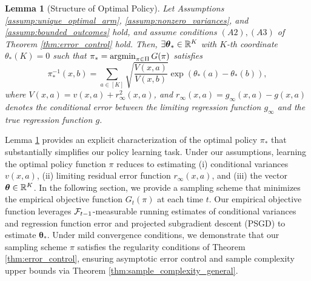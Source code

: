 \documentclass{article}
\newtheorem{lemma}{Lemma}
\begin{document}
\begin{lemma}[Structure of Optimal Policy]\label{lem:optimal_policy_structure}
    Let Assumptions \ref{assump:unique_optimal_arm}, \ref{assump:nonzero_variances}, and \ref{assump:bounded_outcomes} hold, and assume conditions $(A2), (A3)$ of Theorem \ref{thm:error_control} hold. Then, $\exists \boldsymbol{\theta}_* \in \mathbb{R}^K$ with $K$-th coordinate ${\theta_*}(K) = 0$ such that $\pi_* = \argmin_{\pi \in \Pi} G(\pi)$ satisfies 
    \begin{equation}
        \pi_*^{-1}(x,b) = \sum_{a \in [K]} \sqrt{\frac{{V(x,a)}}{{V(x,b)}}} \exp(\theta_*(a) - \theta_*(b)),  
    \end{equation}
    where $V(x,a)= v(x,a) + r_\infty^2(x,a)$, and $r_\infty(x,a)=g_\infty(x,a) - g(x,a)$ denotes the conditional error between the limiting regression function $g_\infty$ and the true regression function $g$. 
\end{lemma}

Lemma \ref{lem:optimal_policy_structure} provides an explicit characterization of the optimal policy $\pi_*$ that substantially simplifies our policy learning task. Under our assumptions, learning the optimal policy function $\pi$ reduces to estimating (i) conditional variances $v(x,a)$, (ii) limiting residual error function $r_\infty(x,a)$, and (iii) the vector $\boldsymbol{\theta} \in \mathbb{R}^K$. In the following section, we provide a sampling scheme that minimizes the empirical objective function $G_t(\pi)$ at each time $t$. Our empirical objective function leverages $\mathcal{F}_{t-1}$-measurable running estimates of conditional variances and regression function error and projected subgradient descent (PSGD) to estimate $\bm{\theta}_*$. Under mild convergence conditions, we demonstrate that our sampling scheme $\pi$ satisfies the regularity conditions of Theorem \ref{thm:error_control}, ensuring asymptotic error control and sample complexity upper bounds via Theorem \ref{thm:sample_complexity_general}. 
\end{document}

